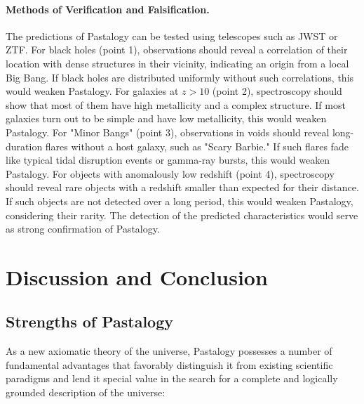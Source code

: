 \documentclass[pdflatex,sn-mathphys-num]{sn-jnl}
\begin{document}
\paragraph{Methods of Verification and Falsification.} The predictions of Pastalogy can be tested using telescopes such as JWST or ZTF. For black holes (point 1), observations should reveal a correlation of their location with dense structures in their vicinity, indicating an origin from a local Big Bang. If black holes are distributed uniformly without such correlations, this would weaken Pastalogy. For galaxies at \( z > 10 \) (point 2), spectroscopy should show that most of them have high metallicity and a complex structure. If most galaxies turn out to be simple and have low metallicity, this would weaken Pastalogy. For "Minor Bangs" (point 3), observations in voids should reveal long-duration flares without a host galaxy, such as "Scary Barbie." If such flares fade like typical tidal disruption events or gamma-ray bursts, this would weaken Pastalogy. For objects with anomalously low redshift (point 4), spectroscopy should reveal rare objects with a redshift smaller than expected for their distance. If such objects are not detected over a long period, this would weaken Pastalogy, considering their rarity. The detection of the predicted characteristics would serve as strong confirmation of Pastalogy.

\section{Discussion and Conclusion}\label{sec:discussion-conclusion}

\subsection{Strengths of Pastalogy}\label{subsec:strengths}

As a new axiomatic theory of the universe, Pastalogy possesses a number of fundamental advantages that favorably distinguish it from existing scientific paradigms and lend it special value in the search for a complete and logically grounded description of the universe:
\end{document}
